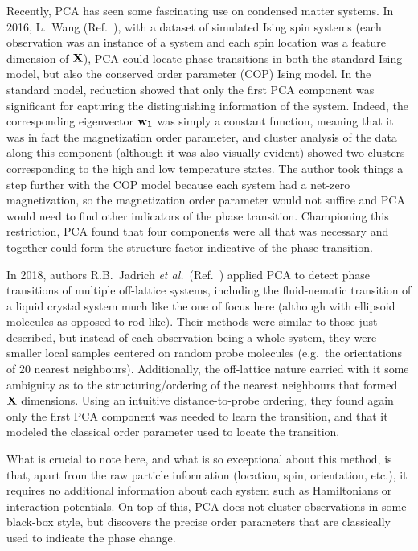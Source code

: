 Recently, PCA has seen some fascinating use on condensed matter systems. In 2016, L.\ Wang (Ref.\ \cite{wang2016ising}), with a dataset of simulated Ising spin systems (each observation was an instance of a system and each spin location was a feature dimension of $\mathbf{X}$), PCA could locate phase transitions in both the standard Ising model, but also the conserved order parameter (COP) Ising model. In the standard model, reduction showed that only the first PCA component was significant for capturing the distinguishing information of the system. Indeed, the corresponding eigenvector $\mathbf{w_1}$ was simply a constant function, meaning that it was in fact the magnetization order parameter, and cluster analysis of the data along this component (although it was also visually evident) showed two clusters corresponding to the high and low temperature states. The author took things a step further with the COP model because each system had a net-zero magnetization, so the magnetization order parameter would not suffice and PCA would need to find other indicators of the phase transition. Championing this restriction, PCA found that four components were all that was necessary and together could form the structure factor indicative of the phase transition.

In 2018, authors R.B.\ Jadrich \textit{et al.}\ (Ref.\ \cite{jadrich2018offlattice}) applied PCA to detect phase transitions of multiple off-lattice systems, including the fluid-nematic transition of a liquid crystal system much like the one of focus here (although with ellipsoid molecules as opposed to rod-like). Their methods were similar to those just described, but instead of each observation being a whole system, they were smaller local samples centered on random probe molecules (e.g.\ the orientations of 20 nearest neighbours). Additionally, the off-lattice nature carried with it some ambiguity as to the structuring/ordering of the nearest neighbours that formed $\mathbf{X}$ dimensions. Using an intuitive distance-to-probe ordering, they found again only the first PCA component was needed to learn the transition, and that it modeled the classical order parameter used to locate the transition.

What is crucial to note here, and what is so exceptional about this method, is that, apart from the raw particle information (location, spin, orientation, etc.), it requires no additional information about each system such as Hamiltonians or interaction potentials. On top of this, PCA does not cluster observations in some black-box style, but discovers the precise order parameters that are classically used to indicate the phase change.

